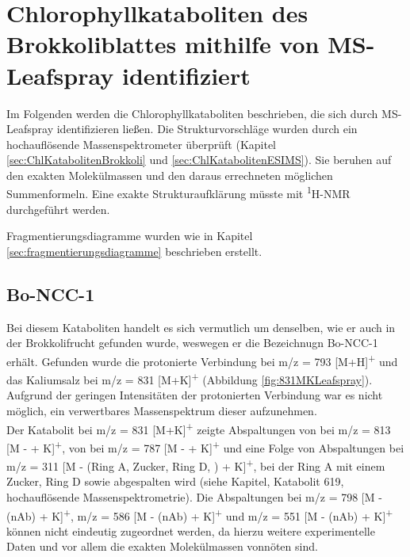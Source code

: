 \section{Chlorophyllkataboliten des Brokkoliblattes mithilfe von MS-Leafspray identifiziert}

Im Folgenden werden die Chlorophyllkataboliten beschrieben, die sich durch MS-Leafspray identifizieren ließen. Die Strukturvorschläge wurden durch ein hochauflösende Massenspektrometer überprüft (Kapitel \ref{sec:ChlKatabolitenBrokkoli} und \ref{sec:ChlKatabolitenESIMS}). Sie beruhen auf den exakten Molekülmassen und den daraus errechneten möglichen Summenformeln. Eine exakte Strukturaufklärung müsste mit \textsuperscript{1}H-NMR durchgeführt werden. 

Fragmentierungsdiagramme wurden wie in Kapitel \ref{sec:fragmentierungsdiagramme} beschrieben erstellt.

\subsection{Bo-NCC-1} \label{sec:MSLeafsprayBoNCC1}

Bei diesem Kataboliten handelt es sich vermutlich um denselben, wie er auch in der Brokkolifrucht gefunden wurde, weswegen er die Bezeichnugn Bo-NCC-1 erhält. \cite{ChlorophyllCatabolitesBroccoli} Gefunden wurde die protonierte Verbindung bei m/z = 793 [M+H]\textsuperscript{+} und das Kaliumsalz bei m/z = 831 [M+K]\textsuperscript{+} (Abbildung \ref{fig:831MKLeafspray}). Aufgrund der geringen Intensitäten der protonierten Verbindung war es nicht möglich, ein verwertbares Massenspektrum dieser aufzunehmen. \\

Der Katabolit bei m/z = 831 [M+K]\textsuperscript{+} zeigte Abspaltungen von  bei m/z = 813 [M -  + K]\textsuperscript{+}, von  bei m/z = 787 [M -  + K]\textsuperscript{+} und eine Folge von Abspaltungen bei m/z = 311 [M - (Ring A, Zucker, Ring D, ) + K]\textsuperscript{+}, bei der Ring A mit einem Zucker, Ring D sowie  abgespalten wird (siehe Kapitel, Katabolit 619, hochauflösende Massenspektrometrie). Die Abspaltungen bei m/z = 798 [M - (\gls{nAb}) + K]\textsuperscript{+}, m/z = 586 [M - (\gls{nAb}) + K]\textsuperscript{+} und m/z = 551 [M - (\gls{nAb}) + K]\textsuperscript{+} können nicht eindeutig zugeordnet werden, da hierzu weitere experimentelle Daten und vor allem die exakten Molekülmassen vonnöten sind. 


